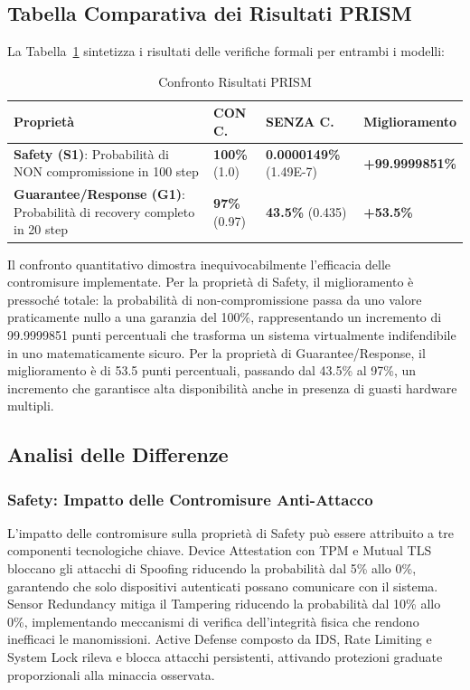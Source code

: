 \subsection{Tabella Comparativa dei Risultati PRISM}
La Tabella~\ref{tab:confronto-prism} sintetizza i risultati delle verifiche formali per entrambi i modelli:
\begin{table}[H]
\centering
\label{tab:confronto-prism}
\begin{tabularx}{\textwidth}{|X|X|X|X|}
\hline
\textbf{Proprietà} & \textbf{CON C.} & \textbf{SENZA C.} & \textbf{Miglioramento} \\ \hline
\textbf{Safety (S1)}: Probabilità di NON compromissione in 100 step & \textbf{100\%} (1.0) & \textbf{0.0000149\%} (1.49E-7) & \textbf{+99.9999851\%} \\ \hline
\textbf{Guarantee/Response (G1)}: Probabilità di recovery completo in 20 step & \textbf{97\%} (0.97) & \textbf{43.5\%} (0.435) & \textbf{+53.5\%} \\ \hline
\end{tabularx}
\caption{Confronto Risultati PRISM}
\end{table}

Il confronto quantitativo dimostra inequivocabilmente l'efficacia delle contromisure implementate. Per la proprietà di Safety, il miglioramento è pressoché totale: la probabilità di non-compromissione passa da uno valore praticamente nullo a una garanzia del 100\%, rappresentando un incremento di 99.9999851 punti percentuali che trasforma un sistema virtualmente indifendibile in uno matematicamente sicuro. Per la proprietà di Guarantee/Response, il miglioramento è di 53.5 punti percentuali, passando dal 43.5\% al 97\%, un incremento che garantisce alta disponibilità anche in presenza di guasti hardware multipli.

\subsection{Analisi delle Differenze}

\subsubsection{Safety: Impatto delle Contromisure Anti-Attacco}
L'impatto delle contromisure sulla proprietà di Safety può essere attribuito a tre componenti tecnologiche chiave. Device Attestation con TPM e Mutual TLS bloccano gli attacchi di Spoofing riducendo la probabilità dal 5\% allo 0\%, garantendo che solo dispositivi autenticati possano comunicare con il sistema. Sensor Redundancy mitiga il Tampering riducendo la probabilità dal 10\% allo 0\%, implementando meccanismi di verifica dell'integrità fisica che rendono inefficaci le manomissioni. Active Defense composto da IDS, Rate Limiting e System Lock rileva e blocca attacchi persistenti, attivando protezioni graduate proporzionali alla minaccia osservata.

